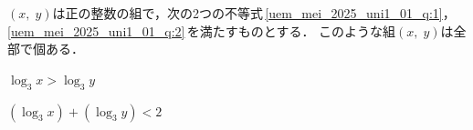 \documentclass[../../../../uem_mei_q.tex]{subfiles}
\begin{document}
    $(x,\;y)$は正の整数の組で，次の2つの不等式\,\ref{uem_mei_2025_uni1_01_q:1}，%
    \ref{uem_mei_2025_uni1_01_q:2}\,を満たすものとする．%
    このような組$(x,\;y)$は全部で\:\:個ある．
    
    \begin{myenua}
        \item $\log_3 x>\log_3 y$ \label{uem_mei_2025_uni1_01_q:1}
        \item $(\log_3 x)+(\log_3 y)<2$ \label{uem_mei_2025_uni1_01_q:2}
    \end{myenua}
\end{document}
